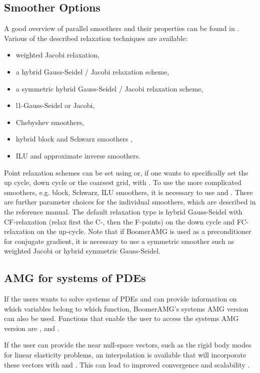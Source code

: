 \subsection{Smoother Options}
A good overview of parallel smoothers and their properties can be found in \cite{Baker_Falgout_Kolev_UMYang_2011}. Various of the described relaxation techniques are available:
\begin{itemize}
\item weighted Jacobi relaxation,
\item a hybrid Gauss-Seidel / Jacobi relaxation scheme, 
\item a symmetric hybrid Gauss-Seidel / Jacobi relaxation scheme, 
\item l1-Gauss-Seidel or Jacobi,
\item Chebyshev smoothers,
\item hybrid block and Schwarz smoothers \cite{UMYang_2004},
\item ILU and approximate inverse smoothers.
\end{itemize}
Point relaxation schemes can be set using  or, if
one wants to specifically set the up cycle, down cycle or the coarsest grid, with 
. To use the more complicated smoothers,
e.g. block, Schwarz, ILU smoothers, it is necessary to use 
and . There are further parameter choices for the
individual smoothers, which are described in the reference manual.
The default relaxation type is hybrid Gauss-Seidel with CF-relaxation (relax first the C-,
then the F-points) on the down cycle and FC-relaxation on the up-cycle. Note that if
BoomerAMG is used as a preconditioner for conjugate gradient, it is necessary to use
a symmetric smoother such as weighted Jacobi or hybrid symmetric Gauss-Seidel.

\subsection{AMG for systems of PDEs}
 
If the users wants to solve systems of PDEs and can provide information on
which variables belong to which function, BoomerAMG's systems AMG version
can also be used. Functions that enable the user to access the systems AMG version 
are , 
and .

If the user can provide the near null-space vectors, such as the rigid body modes for linear elasticity problems, an interpolation is available that will incorporate these vectors with  and . This can lead to improved convergence and scalability \cite{Baker_Kolev_UMYang_2010}.

